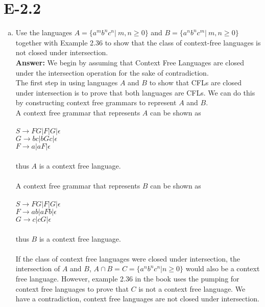 \documentclass{article}
\begin{document}
\section*{E-2.2}
\begin{enumerate}[a.]
\item Use the languages $A=\{a^mb^nc^n|\ m,n \geq 0\}$ and
$B=\{a^nb^nc^m|\ m,n \geq 0\}$ together with Example 2.36 to show
that the class of context-free languages is not closed under intersection.\\
{\bf Answer: } We begin by assuming that Context Free Languages are closed under the intersection operation for the sake of contradiction. \\
The first step in using languages $A$ and $B$ to show that CFLs are closed under intersection is to prove that both languages are CFLs. We can do this by constructing  context free grammars to represent $A$ and $B$.\\
A context free grammar that represents $A$ can be shown as \\ \\
$S\rightarrow FG | F | G | \epsilon$ \\
$G\rightarrow bc | bGc | \epsilon $ \\
$F\rightarrow a | aF | \epsilon$ \\ \\
thus $A$ is a context free language. \\ \\
A context free grammar that represents $B$ can be shown as \\ \\
$S\rightarrow FG | F | G | \epsilon$ \\
$F\rightarrow ab | aFb | \epsilon$ \\
$G\rightarrow c | cG | \epsilon$ \\ \\

thus $B$ is a context free language. \\ \\

If the class of context free languages were closed under intersection, the intersection of $A$ and $B$, $A \cap B = C = \{a^nb^nc^n | n \geq 0\}$ would also be a context free language. However, example 2.36 in the book uses the pumping for context free languages to prove that $C$ is not a context free language. We have a contradiction, context free languages are not closed under intersection.


\end{enumerate}
\end{document}
